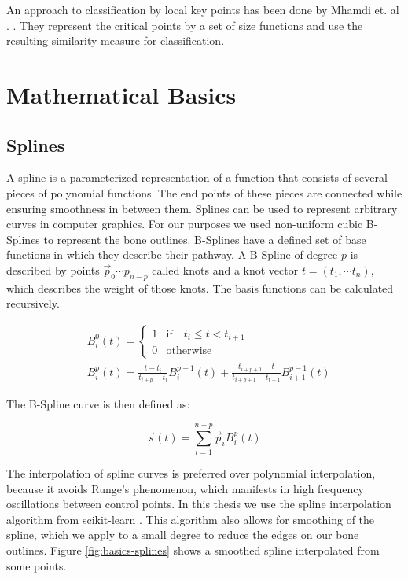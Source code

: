 \documentclass[pdftex,12pt,a4paper]{report}
\begin{document}
An approach to classification by local key points has been done by Mhamdi et. al . \cite{mhamdi2014local}. They represent the critical points by a set of size functions and use the resulting similarity measure for classification.

\chapter{Mathematical Basics}

\section{Splines}
\label{section:splines}

A spline is a parameterized representation of a function that consists of several pieces of polynomial functions. The end points of these pieces are connected while ensuring smoothness in between them. Splines can be used to represent arbitrary curves in computer graphics. For our purposes we used non-uniform cubic B-Splines to represent the bone outlines. B-Splines have a defined set of base functions in which they describe their pathway. A B-Spline of degree $p$ is described by points $\vec{p}_0 \cdots p_{n-p}$ called knots and a knot vector $t = (t_1, \cdots t_{n})$, which describes the weight of those knots. The basis functions can be calculated recursively.

\begin{equation}
\begin{split}
& B_i^0(t) = \left\{
\begin{matrix} 
1 & \mathrm{if} \quad t_i \leq t < t_{i+1} \\
0 & \mathrm{otherwise} 
\end{matrix} \right. \\
& B_i^p(t) = \frac{t - t_i}{t_{i+p} - t_i} B_i^{p-1}(t) + \frac{t_{i+p+1} - t}{t_{i+p+1} - t_{t+1}} B_{i+1}^{p-1}(t)
\end{split} 
\end{equation}

The B-Spline curve is then defined as:

\begin{equation}
\vec{s}(t) =  \sum_{i=1}^{n-p} \vec{p}_i B_i^p(t)
\end{equation}

The interpolation of spline curves is preferred over polynomial interpolation, because it avoids Runge's phenomenon, which manifests in high frequency oscillations between control points. In this thesis we use the spline interpolation algorithm from scikit-learn \cite{pedregosa2011scikit}. This algorithm also allows for smoothing of the spline, which we apply to a small degree to reduce the edges on our bone outlines. Figure \ref{fig:basics-splines} shows a smoothed spline interpolated from some points.
\end{document}
